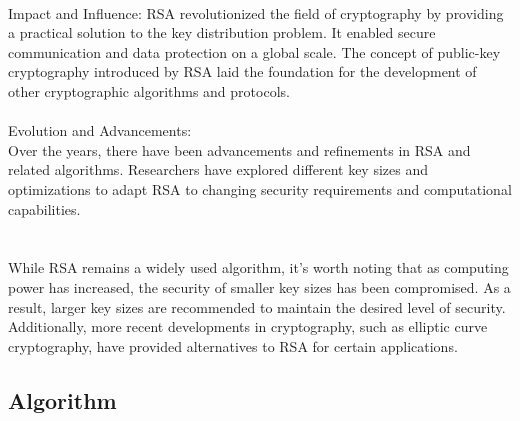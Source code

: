\documentclass{report}
\begin{document}
\\
Impact and Influence:
RSA revolutionized the field of cryptography by providing a practical solution to the key distribution problem. It enabled secure communication and data protection on a global scale. The concept of public-key cryptography introduced by RSA laid the foundation for the development of other cryptographic algorithms and protocols.\\
\\
Evolution and Advancements:\\
Over the years, there have been advancements and refinements in RSA and related algorithms. Researchers have explored different key sizes and optimizations to adapt RSA to changing security requirements and computational capabilities.\\
\\
\\
While RSA remains a widely used algorithm, it's worth noting that as computing power has increased, the security of smaller key sizes has been compromised. As a result, larger key sizes are recommended to maintain the desired level of security. Additionally, more recent developments in cryptography, such as elliptic curve cryptography, have provided alternatives to RSA for certain applications.

\subsection{Algorithm}
\end{document}
